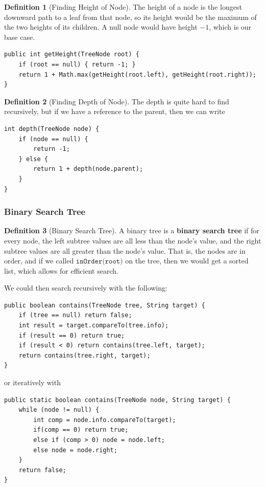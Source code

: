 \documentclass{article}
\theoremstyle{definition}
\theoremstyle{remark}
\theoremstyle{definition}
\newtheorem{definition}{Definition}[section]
\begin{document}
\begin{definition}[Finding Height of Node]
The height of a node is the longest downward path to a leaf from that node, so its height would be the maximum of the two heights of its children. A null node would have height $-1$, which is our base case. 
\begin{verbatim}
public int getHeight(TreeNode root) {
    if (root == null) { return -1; }
    return 1 + Math.max(getHeight(root.left), getHeight(root.right)); 
}
\end{verbatim}
\end{definition}

\begin{definition}[Finding Depth of Node]
The depth is quite hard to find recursively, but if we have a reference to the parent, then we can write 
\begin{verbatim}
int depth(TreeNode node) {
    if (node == null) {
        return -1;
    } else {
        return 1 + depth(node.parent);
    }
}
\end{verbatim}
\end{definition}



\subsubsection{Binary Search Tree}

\begin{definition}[Binary Search Tree]
A binary tree is a \textbf{binary search tree} if for every node, the left subtree values are all less than the node's value, and the right subtree values are all greater than the node's value. That is, the nodes are in order, and if we called $\texttt{inOrder(root)}$ on the tree, then we would get a sorted list, which allows for efficient search. 
\end{definition}

We could then search recursively with the following: 
\begin{verbatim}
public boolean contains(TreeNode tree, String target) {
    if (tree == null) return false; 
    int result = target.compareTo(tree.info); 
    if (result == 0) return true; 
    if (result < 0) return contains(tree.left, target); 
    return contains(tree.right, target); 
}
\end{verbatim}

or iteratively with
\begin{verbatim}
public static boolean contains(TreeNode node, String target) {
    while (node != null) {
        int comp = node.info.compareTo(target); 
        if(comp == 0) return true; 
        else if (comp > 0) node = node.left; 
        else node = node.right; 
    }
    return false; 
}
\end{verbatim}
\end{document}
